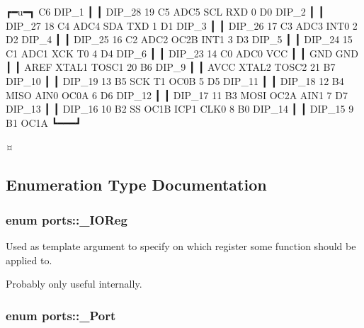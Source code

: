 \begin{DoxyCode}
                                 ┏━u━┓
                     C6    DIP\_1 ┃   ┃ DIP\_28   19   C5   ADC5   SCL
RXD              0   D0    DIP\_2 ┃   ┃ DIP\_27   18   C4   ADC4   SDA
TXD              1   D1    DIP\_3 ┃   ┃ DIP\_26   17   C3   ADC3
        INT0     2   D2    DIP\_4 ┃   ┃ DIP\_25   16   C2   ADC2
OC2B    INT1     3   D3    DIP\_5 ┃   ┃ DIP\_24   15   C1   ADC1
XCK     T0       4   D4    DIP\_6 ┃   ┃ DIP\_23   14   C0   ADC0
                             VCC ┃   ┃ GND
                             GND ┃   ┃ AREF
XTAL1   TOSC1   20   B6    DIP\_9 ┃   ┃ AVCC
XTAL2   TOSC2   21   B7   DIP\_10 ┃   ┃ DIP\_19   13   B5   SCK
T1      OC0B     5   D5   DIP\_11 ┃   ┃ DIP\_18   12   B4   MISO
AIN0    OC0A     6   D6   DIP\_12 ┃   ┃ DIP\_17   11   B3   MOSI   OC2A
AIN1             7   D7   DIP\_13 ┃   ┃ DIP\_16   10   B2   SS     OC1B
ICP1    CLK0     8   B0   DIP\_14 ┃   ┃ DIP\_15    9   B1          OC1A
                                 ┗━━━┛
\end{DoxyCode}
 ¤ 

\subsection{Enumeration Type Documentation}
\subsubsection[{\texorpdfstring{\+\_\+\+I\+O\+Reg}{_IOReg}}]{\setlength{\rightskip}{0pt plus 5cm}enum {\bf ports\+::\+\_\+\+I\+O\+Reg}\hspace{0.3cm}{\ttfamily [strong]}}\hypertarget{namespaceports_a739630fb6b9a9b963453db8e865b6b14}{}\label{namespaceports_a739630fb6b9a9b963453db8e865b6b14}


Used as template argument to specify on which register some function should be applied to. 

Probably only useful internally. 
\subsubsection[{\texorpdfstring{\+\_\+\+Port}{_Port}}]{\setlength{\rightskip}{0pt plus 5cm}enum {\bf ports\+::\+\_\+\+Port}\hspace{0.3cm}{\ttfamily [strong]}}\hypertarget{namespaceports_a9949317f344930bd6ad1097e80c97b67}{}\label{namespaceports_a9949317f344930bd6ad1097e80c97b67}


